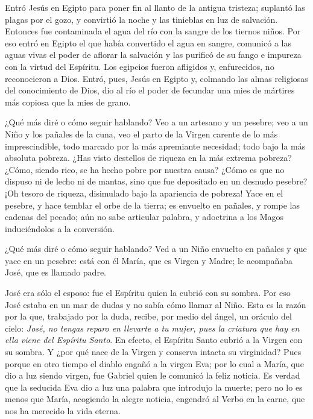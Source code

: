 			\begin{body}
				Entró Jesús en Egipto para poner fin al llanto de la antigua tristeza; suplantó las plagas por el gozo, y convirtió la noche y las tinieblas en luz de salvación. Entonces fue contaminada el agua del río con la sangre de los tiernos niños. Por eso entró en Egipto el que había convertido el agua en sangre, comunicó a las aguas vivas el poder de aflorar la salvación y las purificó de su fango e impureza con la virtud del Espíritu. Los egipcios fueron afligidos y, enfurecidos, no reconocieron a Dios. Entró, pues, Jesús en Egipto y, colmando las almas religiosas del conocimiento de Dios, dio al río el poder de fecundar una mies de mártires más copiosa que la mies de grano.
				
				¿Qué más diré o cómo seguir hablando? Veo a un artesano y un pesebre; veo a un Niño y los pañales de la cuna, veo el parto de la Virgen carente de lo más imprescindible, todo marcado por la más apremiante necesidad; todo bajo la más absoluta pobreza. ¿Has visto destellos de riqueza en la más extrema pobreza? ¿Cómo, siendo rico, se ha hecho pobre por nuestra causa? ¿Cómo es que no dispuso ni de lecho ni de mantas, sino que fue depositado en un desnudo pesebre? ¡Oh tesoro de riqueza, disimulado bajo la apariencia de pobreza! Yace en el pesebre, y hace temblar el orbe de la tierra; es envuelto en pañales, y rompe las cadenas del pecado; aún no sabe articular palabra, y adoctrina a los Magos induciéndolos a la conversión.
				
				¿Qué más diré o cómo seguir hablando? Ved a un Niño envuelto en pañales y que yace en un pesebre: está con él María, que es Virgen y Madre; le acompañaba José, que es llamado padre.
				
				José era sólo el esposo: fue el Espíritu quien la cubrió con su sombra. Por eso José estaba en un mar de dudas y no sabía cómo llamar al Niño. Esta es la razón por la que, trabajado por la duda, recibe, por medio del ángel, un oráculo del cielo: \emph{José, no tengas reparo en llevarte a tu mujer, pues la criatura que hay en ella viene del Espíritu Santo}. En efecto, el Espíritu Santo cubrió a la Virgen con su sombra. Y ¿por qué nace de la Virgen y conserva intacta su virginidad? Pues porque en otro tiempo el diablo engañó a la virgen Eva; por lo cual a María, que dio a luz siendo virgen, fue Gabriel quien le comunicó la feliz noticia. Es verdad que la seducida Eva dio a luz una palabra que introdujo la muerte; pero no lo es menos que María, acogiendo la alegre noticia, engendró al Verbo en la carne, que nos ha merecido la vida eterna.
			\end{body}
		
